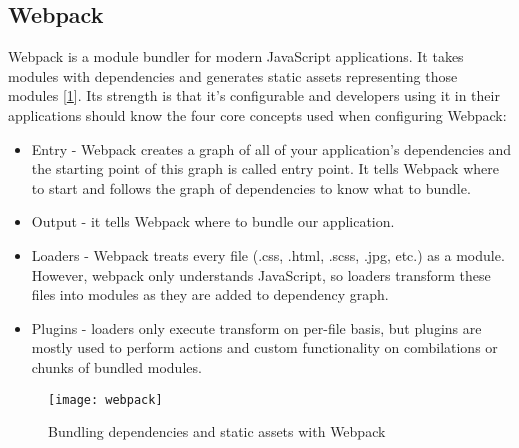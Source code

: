 \subsection{Webpack}
Webpack is a module bundler for modern JavaScript applications. It takes modules with dependencies and generates static assets representing those modules [\ref{r:45}]. Its strength is that it's configurable and developers using it in their applications should know the four core concepts used when configuring Webpack:

\begin{itemize}
\item Entry - Webpack creates a graph of all of your application's dependencies and the starting point of this graph is called entry point. It tells Webpack where to start and follows the graph of dependencies to know what to bundle.
\item Output - it tells Webpack where to bundle our application.
\item Loaders - Webpack treats every file (.css, .html, .scss, .jpg, etc.) as a module. However, webpack only understands JavaScript, so loaders transform these files into modules as they are added to dependency graph.
\item Plugins - loaders only execute transform on per-file basis, but plugins are mostly used to perform actions and custom functionality on combilations or chunks of bundled modules.
\end{itemize}

\begin{figure}[ht!]
\centering
\texttt{[image: webpack]}
\caption{Bundling dependencies and static assets with Webpack}
\label{r:45}
\end{figure}